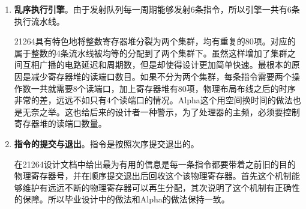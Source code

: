 \begin{enumerate}[label=(\alph*)]
		一个周期最多能够取回4条指令，先锁存一个周期，然后在CAM形式的重命名表中进行重命名和寄存器的分配。需要注意的是，和MIPS一样，Alpha在重命名阶段要特殊处理条件移动指令的映射关系。重命名完毕消除了写后写和读后写的冲突，但是依旧保留了写后读冲突。之后将指令写入发射队列中。发射队列采用分离式，分为整数指令队列和浮点指令队列，最多可以动态发射出6条指令，四条整数指令，两条浮点指令。使用记分牌来判断指令的操作数是否准备就绪。发射的细节上，微结构上有一个20项的定点队列和一个15项的浮点队列，队列只发射的是那些操作数都已经准备好的指令。与此同时，队列由仲裁器来决定填入新的指令。上述模块的逻辑可以由图\ref{fig:rename_21264}来直观的描述。
		\begin{figure}[!htbp]
			\centering
			\texttt{[image: rename]}
			\label{fig:rename_21264}
		\end{figure}
		上图中有一个Saved map state模块，非常重要，它的作用是转移预测错误的恢复处理器状态。注意该表有80项，也即每一条指令分配一项，这样处理器可以从任何一条指令之后精确地恢复状态，而不会受到跳转指令数量的约束。但是缺点是非常消耗资源。当然不光是转移预测错误的恢复，例外中断的状态恢复同样也是用这个表的，但和分支预测错误的恢复机制略有不同。
		\item \textbf{乱序执行引擎}。由于发射队列每一周期能够发射6条指令，所以引擎一共有6条执行流水线。
		
		21264具有特色地将整数寄存器堆分裂为两个集群，均有重复的80项。对应的属于整数的4条流水线被均等的分配到了两个集群下。虽然这样增加了集群之间互相广播的电路延迟和周期数，但是却使得设计更加简单快速。最根本的原因是减少寄存器堆的读端口数目。如果不分为两个集群，每条指令需要两个操作数一共就需要8个读端口，加上寄存器堆有80项，物理布局布线之后的时序非常的差，远远不如只有4个读端口的情况。Alpha这个用空间换时间的做法也是无奈之举。这也给后来的设计者一种警示，为了处理器的主频，必须要控制寄存器堆的读端口数量。
		\item \textbf{指令的提交与退出}。指令是按照次序提交退出的。
		
		在21264设计文档中给出最为有用的信息是每一条指令都要带着之前旧的目的物理寄存器号，并在顺序提交退出后回收这个该物理寄存器。首先这个机制能够维护有远远不断的物理寄存器可以再生分配，其次说明了这个机制有正确性的保障。所以毕业设计中的做法和Alpha的做法保持一致。


\end{enumerate}
